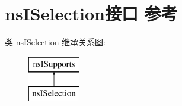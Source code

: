 \hypertarget{interfacens_i_selection}{}\section{ns\+I\+Selection接口 参考}
\label{interfacens_i_selection}
类 ns\+I\+Selection 继承关系图\+:\begin{figure}[H]
\begin{center}
\leavevmode
\includegraphics[height=2.000000cm]{interfacens_i_selection}
\end{center}
\end{figure}
